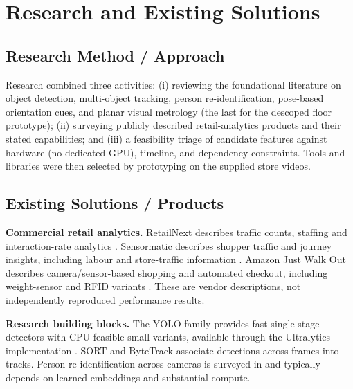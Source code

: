 \chapter{Research and Existing Solutions}
\label{ch:research}
\section{Research Method / Approach}
Research combined three activities: (i) reviewing the foundational literature on object detection, multi-object tracking, person re-identification, pose-based orientation cues, and planar visual metrology (the last for the descoped floor prototype); (ii) surveying publicly described retail-analytics products and their stated capabilities; and (iii) a feasibility triage of candidate features against hardware (no dedicated GPU), timeline, and dependency constraints. Tools and libraries were then selected by prototyping on the supplied store videos.

\section{Existing Solutions / Products}
\textbf{Commercial retail analytics.} RetailNext describes traffic counts, staffing and interaction-rate analytics \cite{retailnextTraffic}. Sensormatic describes shopper traffic and journey insights, including labour and store-traffic information \cite{sensormaticInsights}. Amazon Just Walk Out describes camera/sensor-based shopping and automated checkout, including weight-sensor and RFID variants \cite{amazonJwo}. These are vendor descriptions, not independently reproduced performance results.

\textbf{Research building blocks.} The YOLO family \cite{redmon2016yolo} provides fast single-stage detectors with CPU-feasible small variants, available through the Ultralytics implementation \cite{ultralytics}. SORT \cite{bewley2016sort} and ByteTrack \cite{zhang2022bytetrack} associate detections across frames into tracks. Person re-identification across cameras is surveyed in \cite{ye2022reid} and typically depends on learned embeddings and substantial compute.

